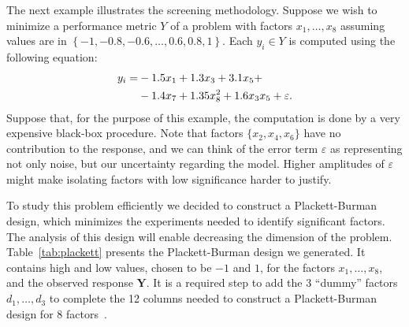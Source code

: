 \documentclass[conference]{IEEEtran}
\begin{document}
The next example illustrates the screening methodology. Suppose we wish to
minimize a performance metric \(Y\) of a problem with factors \(x_1,\dots,x_8\)
assuming values are in \(\left\{-1, -0.8, -0.6, \dots, 0.6, 0.8, 1\right\}\). Each
\(y_i \in Y\) is computed using the following equation:
\vspace{-2pt}
\begin{align}
\label{eq:real_model}
y_i = & -1.5x_1 + 1.3x_3 + 3.1x_5 + \\
& -1.4x_7 + 1.35x_8^2 + 1.6x_3x_5 + \varepsilon\text{.} \nonumber
\vspace{-2pt}
\end{align}\noindent
Suppose that, for the purpose of this example, the computation is done by a very
expensive black-box procedure. Note that factors \(\{x_2,x_4,x_6\}\) have no
contribution to the response, and we can think of the error term \(\varepsilon\)
as representing not only noise, but our uncertainty regarding the model. Higher
amplitudes of \(\varepsilon\) might make isolating factors with low significance
harder to justify.

To study this problem efficiently we decided to construct a Plackett-Burman
design, which minimizes the experiments needed to identify significant factors.
The analysis of this design will enable decreasing the dimension of the problem.
Table~\ref{tab:plackett} presents the Plackett-Burman design we generated.
It contains high and low values, chosen to be \(-1\) and \(1\), for the factors
\(x_1,\dots,x_8\), and the observed response \(\mathbf{Y}\). It is a required step
to add the 3 ``dummy'' factors \(d_1,\dots,d_3\) to complete the 12 columns needed
to construct a Plackett-Burman design for 8
factors~\cite{plackett1946design}.
\end{document}

